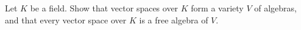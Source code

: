 Let $K$ be a field. Show that vector spaces over $K$ form a variety $V$ of algebras, and that every vector space over $K$ is a free algebra of $V$.
